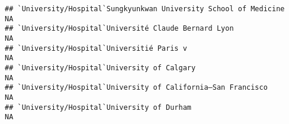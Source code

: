 \documentclass[]{article}
\begin{document}
\begin{verbatim}
## `University/Hospital`Sungkyunkwan University School of Medicine                                                                                                                                                                                                                                                                                                                                                                                                                         NA
## `University/Hospital`Université Claude Bernard Lyon                                                                                                                                                                                                                                                                                                                                                                                                                                     NA
## `University/Hospital`Universitié Paris v                                                                                                                                                                                                                                                                                                                                                                                                                                                NA
## `University/Hospital`University of Calgary                                                                                                                                                                                                                                                                                                                                                                                                                                              NA
## `University/Hospital`University of California–San Francisco                                                                                                                                                                                                                                                                                                                                                                                                                             NA
## `University/Hospital`University of Durham                                                                                                                                                                                                                                                                                                                                                                                                                                               NA

\end{verbatim}
\end{document}
